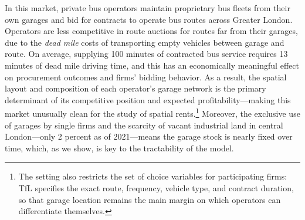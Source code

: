 \documentclass[12pt]{article}
\begin{document}
In this market, private bus operators maintain proprietary bus fleets from their own garages and bid for contracts 
to operate bus routes across Greater London. Operators are less competitive 
in route auctions for routes far from their garages, due to the \emph{dead 
mile} costs of transporting empty vehicles between garage and route. On 
average, supplying 100 minutes of contracted bus service requires 13 minutes 
of dead mile driving time, and this has an economically meaningful effect on 
procurement outcomes and firms' bidding behavior. As a result, the spatial layout and composition  
of each operator's garage network is the primary determinant of its 
competitive position and expected profitability---making this market 
unusually clean for the study of spatial rents.\footnote{The setting also restricts 
the set of choice variables for participating firms: TfL specifies the exact 
route, frequency, vehicle type, and contract duration, so that garage 
location remains the main margin on which operators can differentiate 
themselves.} Moreover, the exclusive use of garages by single firms and the 
scarcity of vacant industrial land in central London---only 2 percent as of 
2021---means the garage stock is nearly fixed over time, which, as we show, 
is key to the tractability of the model.
\end{document}
